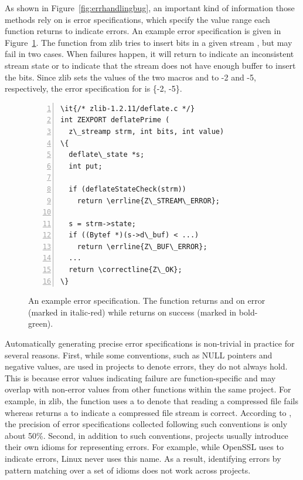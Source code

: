 \documentclass[12pt]{report}	%
\begin{document}
As shown in Figure~\ref{fig:errhandlingbug}, an important kind of information those methods rely on is
error specifications, which specify the value range each function
returns to indicate errors.
%
An example error specification is given in Figure~\ref{fig:errspec}.
The function  from zlib 
tries to insert bits in a given stream ,
but may fail in two cases.
%
When failures happen,
it will return  to indicate an inconsistent stream state
or  to indicate that the stream does not have enough buffer to insert the bits.
%
Since zlib sets the values of the two macros  and 
to -2 and -5, respectively, the error specification for  is \{-2, -5\}.

\begin{figure}[t]
\begin{Verbatim}[numbers=left,xleftmargin=6mm,fontsize=\footnotesize,
    commandchars=\\\{\}]
\it{/* zlib-1.2.11/deflate.c */}
int ZEXPORT deflatePrime (
  z\_streamp strm, int bits, int value)
\{
  deflate\_state *s;
  int put;

  if (deflateStateCheck(strm))
    return \errline{Z\_STREAM\_ERROR};

  s = strm->state;
  if ((Bytef *)(s->d\_buf) < ...)
    return \errline{Z\_BUF\_ERROR};
  ...
  return \correctline{Z\_OK};
\}
\end{Verbatim}
\caption[An example error specification]{An example error specification.
The function  returns 
 and  on error (marked in italic-red)
while returns  on success (marked in bold-green).
}
\label{fig:errspec}
\end{figure}

%
Automatically generating precise error specifications 
is non-trivial in practice for several reasons.
%
First, 
while some conventions, such as
NULL pointers and negative values, are used in projects to denote errors,
they do not always hold.
This is because error values indicating failure are function-specific and 
may overlap with non-error values from other functions within
the same project. 
For example, in zlib, the function
 uses a
 to denote that reading a compressed file fails
whereas 
returns a  to indicate a compressed file stream is correct.
%
According to \cite{Kang:2016:AAI:2970276.2970354}, 
the precision
of error specifications collected following such 
conventions is only about 50\%. 
%
Second, in addition to such conventions, 
projects usually introduce their own idioms for representing errors.
%
For example, while OpenSSL uses  to indicate errors,
Linux never uses this name.
As a result, identifying errors by pattern matching over a set of idioms does not work across projects.
\end{document}
